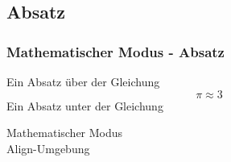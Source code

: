 \documentclass{beamer}
\begin{document}

\subsection{Absatz}
\begin{frame}[fragile]
\frametitle{Mathematischer Modus - Absatz}
  \begin{semiverbatim}
  \end{semiverbatim}
Ein Absatz über der Gleichung
\[\pi \approx 3\]
Ein Absatz unter der Gleichung
\end{frame}

\begin{frame}
 \begin{center}
  \Huge Mathematischer Modus \\
  \Large Align-Umgebung
 \end{center}
\end{frame}
\end{document}

